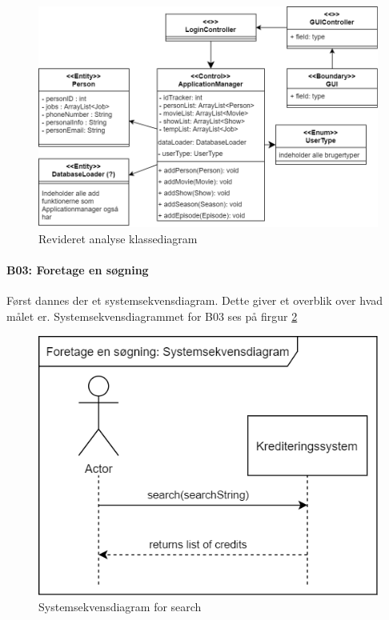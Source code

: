 \begin{figure}[H]
    \centering
    \includegraphics[scale = 0.33]{images/AnalyseKlasseDiagramV2.png}
    \caption{Revideret analyse klassediagram}
    \label{fig:AnalyseKlasseDiagramV2}
\end{figure}

\paragraph{B03: Foretage en søgning} Først dannes der et systemsekvensdiagram. Dette giver et overblik over hvad målet er. Systemsekvensdiagrammet for B03 ses på firgur \ref{fig:SystemsekvensdiagramSearch} 

\begin{figure}[H]
    \centering
\includegraphics[scale = 0.4]{images/B03SSD.png}
    \caption{Systemsekvensdiagram for search}
    \label{fig:SystemsekvensdiagramSearch}
\end{figure}


